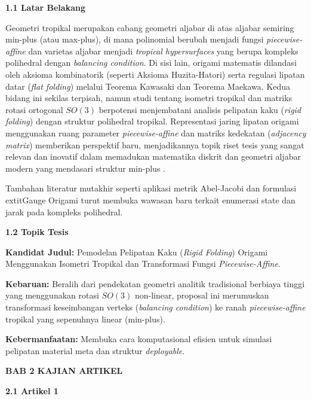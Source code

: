 \documentclass[12pt,a4paper]{article}
\begin{document}
\noindent\textbf{\large 1.1 Latar Belakang}\par
Geometri tropikal merupakan cabang geometri aljabar di atas aljabar semiring min-plus (atau max-plus), di mana polinomial berubah menjadi fungsi \textit{piecewise-affine} dan varietas aljabar menjadi \textit{tropical hypersurfaces} yang berupa kompleks polihedral dengan \textit{balancing condition}. Di sisi lain, origami matematis dilandasi oleh aksioma kombinatorik (seperti Aksioma Huzita-Hatori) serta regulasi lipatan datar (\textit{flat folding}) melalui Teorema Kawasaki dan Teorema Maekawa. Kedua bidang ini sekilas terpisah, namun studi tentang isometri tropikal dan matriks rotasi ortogonal $SO(3)$ berpotensi menjembatani analisis pelipatan kaku (\textit{rigid folding}) dengan struktur polihedral tropikal. Representasi jaring lipatan origami menggunakan ruang parameter \textit{piecewise-affine} dan matriks kedekatan (\textit{adjacency matrix}) memberikan perspektif baru, menjadikannya topik riset tesis yang sangat relevan dan inovatif dalam memadukan matematika diskrit dan geometri aljabar modern yang mendasari struktur min-plus \cite{mikhalkin2006tropical}.\par
Tambahan literatur mutakhir seperti aplikasi metrik Abel-Jacobi \cite{foster2020metric} dan formulasi 	extit{Gauge Origami} \cite{nekrasov2018geometry} turut membuka wawasan baru terkait enumerasi state dan jarak pada kompleks polihedral.\par

\noindent\textbf{\large 1.2 Topik Tesis}\par
\textbf{Kandidat Judul:} Pemodelan Pelipatan Kaku (\textit{Rigid Folding}) Origami Menggunakan Isometri Tropikal dan Transformasi Fungsi \textit{Piecewise-Affine}.\par
\textbf{Kebaruan:} Beralih dari pendekatan geometri analitik tradisional berbiaya tinggi yang menggunakan rotasi $SO(3)$ non-linear, proposal ini merumuskan transformasi keseimbangan verteks (\textit{balancing condition}) ke ranah \textit{piecewise-affine} tropikal yang sepenuhnya linear (min-plus).\par
\textbf{Kebermanfaatan:} Membuka cara komputasional efisien untuk simulasi pelipatan material meta dan struktur \textit{deployable}.

\newpage
\noindent\textbf{\Large BAB 2 KAJIAN ARTIKEL}\par\bigskip

\noindent\textbf{\large 2.1 Artikel 1 \cite{maclagan2015tropical}}\par
\end{document}
